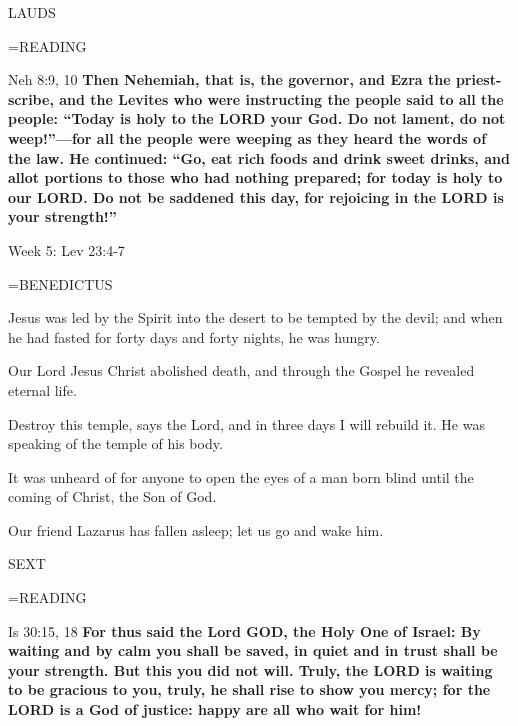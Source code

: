 \begin{flushleft}\normalsize LAUDS\\\end{flushleft}
\hangindent=\parindent \small READING
\begin{description}[labelindent=\parindent, leftmargin=*]
\item [Weeks 1-4:]     Neh 8:9, 10 \textbf{    Then Nehemiah, that is, the governor, and Ezra the priest-scribe, and the Levites who were instructing the people said to all the people: “Today is holy to the LORD your God. Do not lament, do not weep!”—for all the people were weeping as they heard the words of the law. He continued: “Go, eat rich foods and drink sweet drinks, and allot portions to those who had nothing prepared; for today is holy to our LORD. Do not be saddened this day, for rejoicing in the LORD is your strength!” }
\end{description}

Week 5:  Lev 23:4-7  

\hangindent=\parindent \small BENEDICTUS
\begin{description}[labelindent=\parindent, noitemsep, leftmargin=*]
\item [Week 1:] 	Jesus was led by the Spirit into the desert to be tempted by the devil; and when he had fasted for forty days and forty nights, he was hungry.
\item [Week 2:] 	Our Lord Jesus Christ abolished death, and through the Gospel he revealed eternal life.
\item [Week 3:] 	Destroy this temple, says the Lord, and in three days I will rebuild it. He was speaking of the temple of his body.
\item [Week 4:] 	It was unheard of for anyone to open the eyes of a man born blind until the coming of Christ, the Son of God.
\item [Week 5:] 	Our friend Lazarus has fallen asleep; let us go and wake him.
\end{description}

\begin{flushleft}\normalsize SEXT\\\end{flushleft}
\hangindent=\parindent \small READING
\begin{description}[labelindent=\parindent, leftmargin=*]
\item [Week 1-4:]   Is 30:15, 18 \textbf{  For thus said the Lord GOD, the Holy One of Israel: By waiting and by calm you shall be saved, in quiet and in trust shall be your strength. But this you did not will. Truly, the LORD is waiting to be gracious to you, truly, he shall rise to show you mercy; for the LORD is a God of justice: happy are all who wait for him!}
\end{description}


